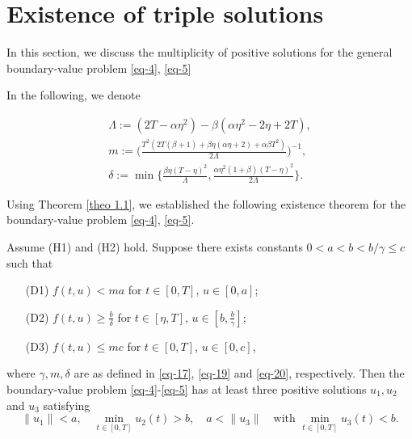 \documentclass[reqno]{amsart}\usepackage{amsmath}
\begin{document}
\section{Existence of triple solutions}

In this section, we discuss the multiplicity of positive solutions for the general
boundary-value problem \eqref{eq-4}, \eqref{eq-5}




In the following, we denote



\begin{gather}
\Lambda:=(2T-\alpha\eta^{2})-\beta(\alpha\eta^{2}-2\eta+2T), \label{eq-18}\\
m:=\Big(\frac{T^{2}(2T(\beta+1)+\beta\eta(\alpha
\eta+2)+\alpha\beta T^{2})}{2\Lambda}\Big) ^{-1},  \label{eq-19}\\
\delta :=\min\Big\{\frac{\beta\eta(T-\eta)^{2}}{\Lambda},
 \frac{\alpha\eta^{2}(1+\beta)(T-\eta)^{2}}{2\Lambda} \Big\}. \label{eq-20}
\end{gather}



Using Theorem \ref{theo 1.1}, we established the following existence theorem for the boundary-value
problem \eqref{eq-4}, \eqref{eq-5}.



\begin{theorem}\label{threesolution}
Assume {\rm (H1)} and {\rm (H2)} hold.
Suppose there exists constants $0<a<b<b/\gamma\le c$ such that
\begin{enumerate}
\item[(D1)] $f(t, u)<ma$ for  $t\in[0, T]$, $u\in[0, a]$;
\item[(D2)] $f(t, u)\ge\frac b\delta$  for $t\in[\eta, T]$,
$u\in[b, \frac b\gamma]$;
\item[(D3)] $f(t, u)\le mc$ for
$t\in[0, T]$, $u\in[0,c]$,
\end{enumerate}
where $\gamma, m, \delta$ are as defined in \eqref{eq-17},
\eqref{eq-19} and \eqref{eq-20}, respectively. Then the
boundary-value problem \eqref{eq-4}-\eqref{eq-5} has at least
three positive solutions $u_1, u_2$ and $u_3$ satisfying
$$
\|u_1\|<a,\quad\min_{t\in[0, T]}u_2(t)>b,\quad a<\|u_3\|\quad\text{with }
\min_{t\in[0, T]}u_3(t)<b.
$$
\end{theorem}
\end{document}
